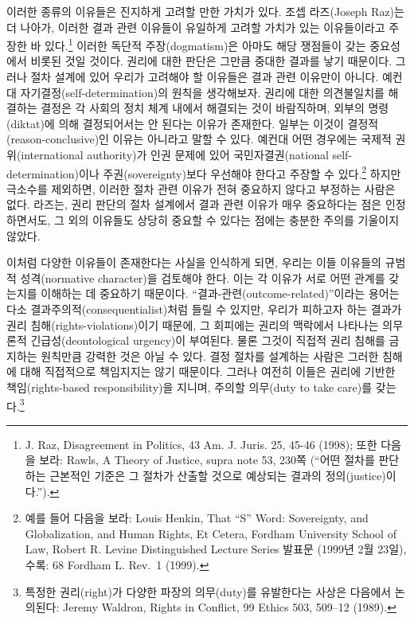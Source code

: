 \documentclass[a4paper,12pt,oneside]{article}  %
\begin{document}
이러한 종류의 이유들은 진지하게 고려할 만한 가치가 있다. 조셉
라즈(Joseph Raz)는 더 나아가, 이러한 결과 관련 이유들이 유일하게 고려할
가치가 있는 이유들이라고 주장한 바 있다.\footnote{J. Raz, Disagreement
  in Politics, 43 Am. J. Juris. 25, 45-46 (1998); 또한 다음을 보라:
  Rawls, A Theory of Justice, supra note 53, 230쪽 (``어떤 절차를
  판단하는 근본적인 기준은 그 절차가 산출할 것으로 예상되는 결과의
  정의(justice)이다.'').} 이러한 독단적 주장(dogmatism)은 아마도 해당
쟁점들이 갖는 중요성에서 비롯된 것일 것이다. 권리에 대한 판단은 그만큼
중대한 결과를 낳기 때문이다. 그러나 절차 설계에 있어 우리가 고려해야 할
이유들은 결과 관련 이유만이 아니다. 예컨대
자기결정(self-determination)의 원칙을 생각해보자. 권리에 대한
의견불일치를 해결하는 결정은 각 사회의 정치 체계 내에서 해결되는 것이
바람직하며, 외부의 명령(diktat)에 의해 결정되어서는 안 된다는 이유가
존재한다. 일부는 이것이 결정적(reason-conclusive)인 이유는 아니라고 말할
수 있다. 예컨대 어떤 경우에는 국제적 권위(international authority)가
인권 문제에 있어 국민자결권(national self-determination)이나
주권(sovereignty)보다 우선해야 한다고 주장할 수 있다.\footnote{예를 들어
  다음을 보라: Louis Henkin, That ``S'' Word: Sovereignty, and
  Globalization, and Human Rights, Et Cetera, Fordham University School
  of Law, Robert R. Levine Distinguished Lecture Series 발표문 (1999년
  2월 23일), 수록: 68 Fordham L. Rev.~1 (1999).} 하지만 극소수를
제외하면, 이러한 절차 관련 이유가 전혀 중요하지 않다고 부정하는 사람은
없다. 라즈는, 권리 판단의 절차 설계에서 결과 관련 이유가 매우 중요하다는
점은 인정하면서도, 그 외의 이유들도 상당히 중요할 수 있다는 점에는
충분한 주의를 기울이지 않았다.

이처럼 다양한 이유들이 존재한다는 사실을 인식하게 되면, 우리는 이들
이유들의 규범적 성격(normative character)을 검토해야 한다. 이는 각
이유가 서로 어떤 관계를 갖는지를 이해하는 데 중요하기 때문이다.
``결과-관련(outcome-related)''이라는 용어는 다소
결과주의적(consequentialist)처럼 들릴 수 있지만, 우리가 피하고자 하는
결과가 권리 침해(rights-violations)이기 때문에, 그 회피에는 권리의
맥락에서 나타나는 의무론적 긴급성(deontological urgency)이 부여된다.
물론 그것이 직접적 권리 침해를 금지하는 원칙만큼 강력한 것은 아닐 수
있다. 결정 절차를 설계하는 사람은 그러한 침해에 대해 직접적으로
책임지지는 않기 때문이다. 그러나 여전히 이들은 권리에 기반한
책임(rights-based responsibility)을 지니며, 주의할 의무(duty to take
care)를 갖는다.\footnote{특정한 권리(right)가 다양한 파장의 의무(duty)를
  유발한다는 사상은 다음에서 논의된다: Jeremy Waldron, Rights in
  Conflict, 99 Ethics 503, 509--12 (1989).}
\end{document}
